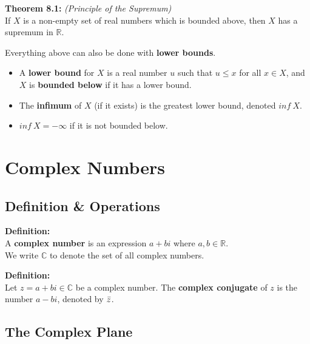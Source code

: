 \documentclass{report}
\newenvironment{frameblue}[1][BlueViolet]
  {\begin{tcolorbox}[colframe=#1,colback=white]}
  {\end{tcolorbox}}
\newenvironment{framered}[1][Maroon]
  {\begin{tcolorbox}[colframe=#1,colback=white]}
  {\end{tcolorbox}}
\begin{document}
\begin{framered}
    \textbf{Theorem 8.1:} \textit{(Principle of the Supremum)}\\
    If $X$ is a non-empty set of real numbers which is bounded above, then $X$ has a supremum in $\mathbb{R}$.
\end{framered}

Everything above can also be done with \textbf{lower bounds}.
\begin{itemize}
    \item A \textbf{lower bound} for $X$ is a real number $u$ such that $u \leq x$ for all $x \in X$, and $X$ is \textbf{bounded below} if it has a lower bound.
    \item The \textbf{infimum} of $X$ (if it exists) is the greatest lower bound, denoted $inf \: X$.
    \item $inf \: X = -\infty$ if it is not bounded below.
\end{itemize}

\chapter{Complex Numbers}
\section{Definition \& Operations}

\begin{frameblue}
    \textbf{Definition:}\\
    A \textbf{complex number} is an expression $a + bi$ where $a,b \in \mathbb{R}$.\\
    We write $\mathbb{C}$ to denote the set of all complex numbers.
\end{frameblue}

\begin{frameblue}
    \textbf{Definition:}\\
    Let $z = a + bi \in \mathbb{C}$ be a complex number. The \textbf{complex conjugate} of $z$ is the number $a - bi$, denoted by $\Bar{z}$. 
\end{frameblue}

\section{The Complex Plane}
\end{document}
